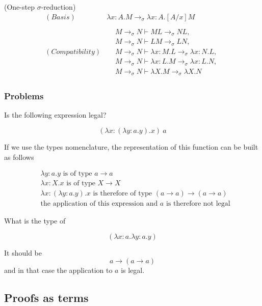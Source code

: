 \begin{definition}
(One-step $\sigma$-reduction)
\[
\begin{array}{ll}
     (Basis) & \lambda x:A.M \to_{\sigma} \lambda x:A.[A/x]M \\
     \\
     (Compatibility) & \begin{aligned}
        & M \to_{\sigma} N \vdash ML \to_{\sigma} NL, \\
        & M \to_{\sigma} N \vdash LM \to_{\sigma} LN, \\
        & M \to_{\sigma} N \vdash \lambda x:M.L \to_{\sigma} \lambda x:N.L, \\
        & M \to_{\sigma} N \vdash \lambda x:L.M \to_{\sigma} \lambda x:L.N, \\
        & M \to_{\sigma} N \vdash \lambda X.M \to_{\sigma} \lambda X.N
     \end{aligned}
\end{array}
\]
\end{definition}

\subsubsection{Problems}

Is the following expression legal?

\[
(\lambda x:(\lambda y:a.y).x)\ a
\]

If we use the types nomenclature, the representation of this function can be built as follows

\[
\begin{array}{ll}
     & \lambda y:a.y\text{ is of type }a \to a\\
     & \lambda x:X.x\text{ is of type }X \to X\\
     & \lambda x:(\lambda y:a.y).x\text{ is therefore of type }(a \to a) \to (a \to a)\\
     & \text{the application of this expression and $a$ is therefore not legal}
\end{array}
\]

What is the type of 

\[
(\lambda x:a.\lambda y:a.y)
\]

It should be
\[
a \to (a \to a)
\]
and in that case the application to $a$ is legal.

\subsection{Proofs as terms}

